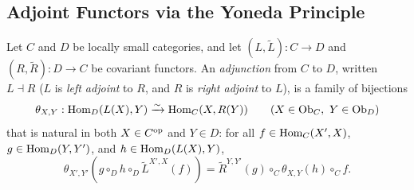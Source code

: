 \documentclass[10pt,a4paper]{article}
\begin{document}
\subsection{Adjoint Functors via the Yoneda Principle}
\begin{definition}\label{def:adjunction}
Let $C$ and $D$ be locally small categories, and let $(L, \widetilde{L}) : C \to D$ and $(R, \widetilde{R}) : D \to C$ be covariant functors. An \emph{adjunction} from $C$ to $D$, written $L \dashv R$ ($L$ is \emph{left adjoint} to $R$, and $R$ is \emph{right adjoint} to $L$), is a family of bijections
$$\theta_{X,Y} : \Hom_D(L(X), Y) \xrightarrow{\sim} \Hom_C(X, R(Y)) \qquad (X \in \Ob_C,\ Y \in \Ob_D)$$
that is natural in both $X \in C^{\textrm{op}}$ and $Y \in D$: for all $f \in {\textrm{Hom}}_C(X', X)$, $g \in {\textrm{Hom}}_D(Y, Y')$, and $h \in {\textrm{Hom}}_D(L(X), Y)$,
$$\theta_{X', Y'}\left(g \circ_D h \circ_D \widetilde{L}^{X',X}(f)\right) = \widetilde{R}^{Y,Y'}(g) \circ_C \theta_{X,Y}(h) \circ_C f.$$
\end{definition}
\end{document}
